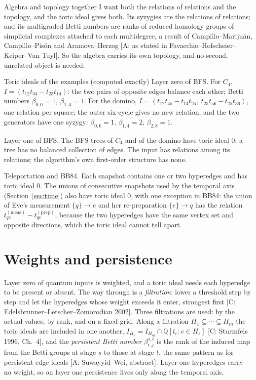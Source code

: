 \documentclass[11pt,a4paper]{article}
\newcommand{\Q}{\mathbb{Q}}
\newcommand{\gr}[1]{\textsf{[#1]}}
\begin{document}
\begin{why}{Algebra and topology together}
I want both the relations of relations and the topology, and the toric ideal gives both. Its syzygies are the relations of relations; and its multigraded Betti numbers are ranks of reduced homology groups of simplicial complexes attached to each multidegree, a result of Campillo--Marijuán, Campillo--Pisón and Aramova--Herzog \gr{A: as stated in Favacchio--Hofscheier--Keiper--Van Tuyl}. So the algebra carries its own topology, and no second, unrelated object is needed.
\end{why}

\begin{ex}{Toric ideals of the examples (computed exactly)}
Layer zero of BFS. For $C_4$, $I=(t_{12}t_{34}-t_{23}t_{14})$: the two pairs of opposite edges balance each other; Betti numbers $\beta_{0,0}=1$, $\beta_{1,4}=1$. For the domino, $I=(t_{12}t_{45}-t_{14}t_{25},\ t_{23}t_{56}-t_{25}t_{36})$, one relation per square; the outer six-cycle gives no new relation, and the two generators have one syzygy: $\beta_{0,0}=1$, $\beta_{1,4}=2$, $\beta_{2,8}=1$.

Layer one of BFS. The BFS trees of $C_4$ and of the domino have toric ideal $0$: a tree has no balanced collection of edges. The input has relations among its relations; the algorithm's own first-order structure has none.

Teleportation and BB84. Each snapshot contains one or two hyperedges and has toric ideal $0$. The unions of consecutive snapshots used by the temporal axis (Section~\ref{sec:time}) also have toric ideal $0$, with one exception in BB84: the union of Eve's measurement $\{q\}\to e$ and her re-preparation $\{e\}\to q$ has the relation $t_{qe}^{(\mathrm{meas})}-t_{qe}^{(\mathrm{prep})}$, because the two hyperedges have the same vertex set and opposite directions, which the toric ideal cannot tell apart.
\end{ex}

\section{Weights and persistence}\label{sec:pers}

Layer zero of quantum inputs is weighted, and a toric ideal needs each hyperedge to be present or absent. The way through is a \emph{filtration}: lower a threshold step by step and let the hyperedges whose weight exceeds it enter, strongest first \gr{C: Edelsbrunner--Letscher--Zomorodian 2002}. Three filtrations are used: by the actual values, by rank, and on a fixed grid. Along a filtration $H_1\subseteq\cdots\subseteq H_m$ the toric ideals are included in one another, $I_{H_s}=I_{H_m}\cap\Q[t_e:e\in H_s]$ \gr{C: Sturmfels 1996, Ch.~4}, and the \emph{persistent Betti number} $\beta^{s,t}_{i,j}$ is the rank of the induced map from the Betti groups at stage $s$ to those at stage $t$, the same pattern as for persistent edge ideals \gr{A: Suwayyid--Wei, abstract}. Layer-one hyperedges carry no weight, so on layer one persistence lives only along the temporal axis.
\end{document}
